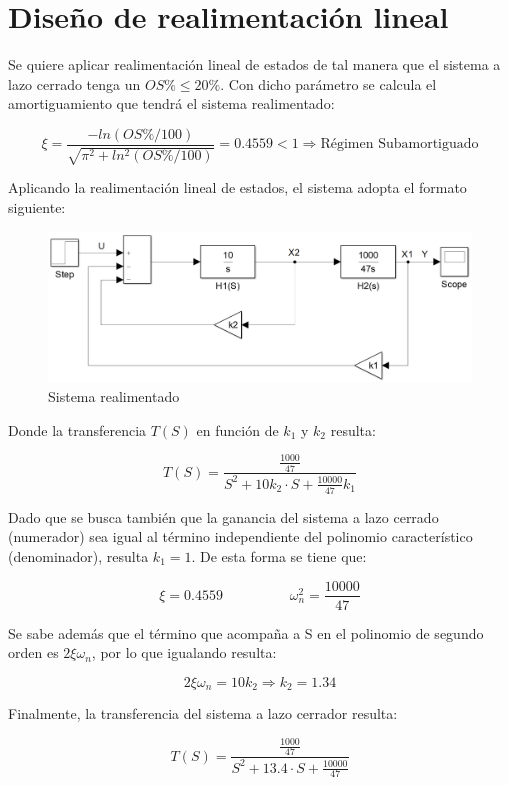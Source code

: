\documentclass{article}
\begin{document}
\newpage
\section{Diseño de realimentación lineal}
Se quiere aplicar realimentación lineal de estados de tal manera que el sistema a lazo cerrado tenga un $OS\% \leq 20\%$. Con dicho parámetro se calcula el amortiguamiento que tendrá el sistema realimentado:

\[
\xi = \frac{-ln(OS\% / 100)}{\sqrt{\pi^2 + ln^2(OS\% / 100)}} = 0.4559 < 1 \Longrightarrow \textrm{Régimen Subamortiguado}
\]



Aplicando la realimentación lineal de estados, el sistema adopta el formato siguiente:

\begin{figure}[H]
\centering
\includegraphics[width=0.9\linewidth]{Imagenes/HLazoCerrado.png}
\caption{Sistema realimentado}
\label{fig:Circuito}
\end{figure}

Donde la transferencia $T(S)$ en función de $k_1$ y $k_2$ resulta:

\[
T(S) = \frac{\frac{1000}{47}}{S^2 + 10k_2 \cdot S + \frac{10000}{47}k_1}
\]

Dado que se busca también que la ganancia del sistema a lazo cerrado (numerador) sea igual al término independiente del polinomio característico (denominador), resulta $k_1 = 1$. De esta forma se tiene que:

\[
\xi = 0.4559 \hspace{2cm} \omega_n^2 = \frac{10000}{47}
\]

Se sabe además que el término que acompaña a S en el polinomio de segundo orden es $2 \xi \omega_n$, por lo que igualando resulta:

\[
2 \xi \omega_n = 10k_2 \Longrightarrow k_2 = 1.34
\]

Finalmente, la transferencia del sistema a lazo cerrador resulta:

\[
T(S) = \frac{\frac{1000}{47}}{S^2 + 13.4 \cdot S + \frac{10000}{47}}
\]
\end{document}
